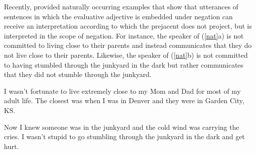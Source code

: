\documentclass[11pt,fleqn]{article}
\newcommand{\6}{\mbox{$[\hspace*{-.6mm}[$}}
\newcommand{\9}{\mbox{$]\hspace*{-.6mm}]$}}
\begin{document}
Recently, \citet{karttunen-etal2014} provided naturally occurring examples that show that utterances of sentences in which the evaluative adjective is embedded under negation can receive an interpretation according to which the prejacent
does not project, but is interpreted in the scope of negation. For instance, the speaker of (\ref{nat}a) is not committed to living close to their parents and instead communicates that they do not live close to their parents. Likewise, the speaker of (\ref{nat}b) is not committed to having stumbled through the junkyard in the dark but rather communicates that they did not stumble through the junkyard. 

\begin{exe}
\ex\label{nat} \citealt[235]{karttunen-etal2014}
\begin{xlist}
\ex I wasn't fortunate to live extremely close to my Mom and Dad for most of my adult life. The closest was when I was in Denver and they were in Garden City, KS.


\ex  Now I knew someone was in the junkyard and the cold wind was
carrying the cries. I wasn't stupid to go stumbling through the
junkyard in the dark and get hurt.

\end{xlist} \end{exe} 
\end{document}

